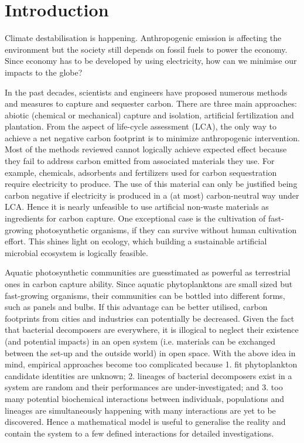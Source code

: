 \documentclass[../thesis.tex]{subfiles} %
\begin{document}
\section{Introduction}

Climate destabilisation is happening.\autocite{notz2016observed,schuur2015climate}  Anthropogenic emission is affecting the environment\autocite{notz2016observed} but the society still depends on fossil fuels to power the economy.\autocite{lotfalipour2010economic}  Since economy has to be developed by using electricity,\autocite{ferguson2000electricity} how can we minimise our impacts to the globe?

In the past decades, scientists and engineers have proposed numerous methods and measures to capture and sequester carbon.\autocite{farrelly2013carbon,yang2008progress}  There are three main approaches: abiotic (chemical or mechanical) capture and isolation, artificial fertilization and plantation.  From the aspect of life-cycle assessment (LCA), the only way to achieve a net negative carbon footprint is to minimize anthropogenic intervention.  Most of the methods reviewed cannot logically achieve expected effect because they fail to address carbon emitted from associated materials they use.  For example, chemicals, adsorbents and fertilizers used for carbon sequestration require electricity to produce.  The use of this material can only be justified being carbon negative if electricity is produced in a (at most) carbon-neutral way under LCA.  Hence it is nearly unfeasible to use artificial non-waste materials as ingredients for carbon capture.  One exceptional case is the cultivation of fast-growing photosynthetic organisms,\autocite{farrelly2013carbon} if they can survive without human cultivation effort.  This shines light on ecology, which building a sustainable artificial microbial ecosystem is logically feasible.

Aquatic photosynthetic communities are guesstimated as powerful as terrestrial ones in carbon capture ability.\autocite{SCHLESINGER2013341}  Since aquatic phytoplanktons are small sized but fast-growing organisms, their communities can be bottled into different forms, such as panels and bulbs\autocite{evanson_2019}.  If this advantage can be better utilised, carbon footprints from cities and industries can potentially be decreased.  Given the fact that bacterial decomposers are everywhere, it is illogical to neglect their existence (and potential impacts) in an open system (i.e. materials can be exchanged between the set-up and the outside world) in open space.  With the above idea in mind, empirical approaches become too complicated because 1. fit phytoplankton candidate identities are unknown; 2. lineages of bacterial decomposers exist in a system are random and their performances are under-investigated; and 3. too many potential biochemical interactions between individuals, populations and lineages are simultaneously happening with many interactions are yet to be discovered.  Hence a mathematical model is useful to generalise the reality and contain the system to a few defined interactions for detailed investigations.
\end{document}
